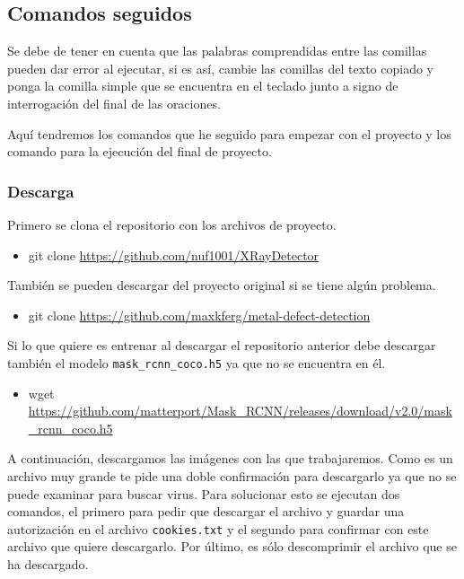 \subsection{Comandos seguidos}

Se debe de tener en cuenta que las palabras comprendidas entre las comillas pueden dar error al ejecutar, si es así, cambie las comillas del texto copiado y ponga la comilla simple que se encuentra en el teclado junto a signo de interrogación del final de las oraciones.

Aquí tendremos los comandos que he seguido para empezar con el proyecto y los comando para la ejecución del final de proyecto.

\subsubsection{Descarga\label{descarga}}

Primero se clona el repositorio con los archivos de proyecto.

\begin{itemize}
    \tightlist
    \item git clone \url{https://github.com/nuf1001/XRayDetector}
\end{itemize}

También se pueden descargar del proyecto original si se tiene algún problema.

\begin{itemize}
    \tightlist
    \item git clone \url{https://github.com/maxkferg/metal-defect-detection}
\end{itemize}

Si lo que quiere es entrenar al descargar el repositorio anterior debe descargar también el modelo \texttt{mask\_rcnn\_coco.h5} ya que no se encuentra en él.

\begin{itemize}
    \tightlist
    \item wget \url{https://github.com/matterport/Mask\_RCNN/releases/download/v2.0/mask\_rcnn\_coco.h5}
\end{itemize}

A continuación, descargamos las imágenes con las que trabajaremos. Como es un archivo muy grande te pide una doble confirmación para descargarlo ya que no se puede examinar para buscar virus. Para solucionar esto se ejecutan dos comandos, el primero para pedir que descargar el archivo y guardar una autorización en el archivo \texttt{cookies.txt} y el segundo para confirmar con este archivo que quiere descargarlo. Por último, es sólo descomprimir el archivo que se ha descargado.

